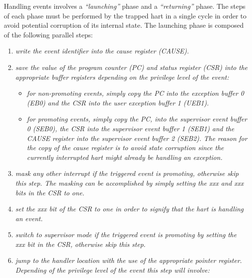        Handling events involves a \textit{``launching''} phase and a \textit{``returning''} phase. The steps of each phase must be performed by the trapped hart in a single cycle in order to avoid potential corruption of its internal state. The launching phase is composed of the following parallel steps:

        \begin{enumerate}

            \item \textit{write the event identifier into the cause register (CAUSE).}

            \item \textit{save the value of the program counter (PC) and status register (CSR) into the appropriate buffer registers depending on the privilege level of the event:}

                \begin{itemize}

                    \item \textit{for non-promoting events, simply copy the PC into the exception buffer 0 (EB0) and the CSR into the user exception buffer 1 (UEB1).}

                    \item \textit{for promoting events, simply copy the PC, into the supervisor event buffer 0 (SEB0), the CSR into the supervisor event buffer 1 (SEB1) and the CAUSE register into the supervisor event buffer 2 (SEB2). The reason for the copy of the cause register is to avoid state corruption since the currently interrupted hart might already be handling an exception.}

                \end{itemize}

            \item \textit{mask any other interrupt if the triggered event is promoting, otherwise skip this step. The masking can be accomplished by simply setting the xxx and xxx bits in the CSR to one.}

            \item \textit{set the xxx bit of the CSR to one in order to signify that the hart is handling an event.}

            \item \textit{switch to supervisor mode if the triggered event is promoting by setting the xxx bit in the CSR, otherwise skip this step.}

            \item \textit{jump to the handler location with the use of the appropriate pointer register. Depending of the privilege level of the event this step will involve:}


\end{enumerate}
